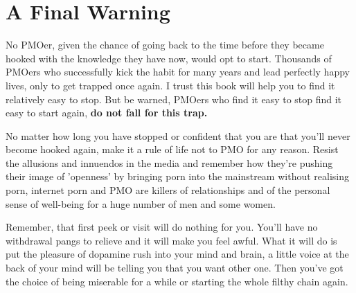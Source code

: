 \documentclass[easypeasy.tex]{subfiles}
\begin{document}
\section{A Final Warning}

No PMOer, given the chance of going back to the time before they became hooked with the knowledge they have now, would opt to start. Thousands of PMOers who successfully kick the habit for many years and lead perfectly happy lives, only to get trapped once again. I trust this book will help you to find it relatively easy to stop. But be warned, PMOers who find it easy to stop find it easy to start again, \textbf{do not fall for this trap.}

No matter how long you have stopped or confident that you are that you'll never become hooked again, make it a rule of life not to PMO for any reason. Resist the allusions and innuendos in the media and remember how they're pushing their image of 'openness' by bringing porn into the mainstream without realising porn, internet porn and PMO are killers of relationships and of the personal sense of well-being for a huge number of men and some women.

Remember, that first peek or visit will do nothing for you. You'll have no withdrawal pangs to relieve and it will make you feel awful. What it will do is put the pleasure of dopamine rush into your mind and brain, a little voice at the back of your mind will be telling you that you want other one. Then you've got the choice of being miserable for a while or starting the whole filthy chain again.
\end{document}
